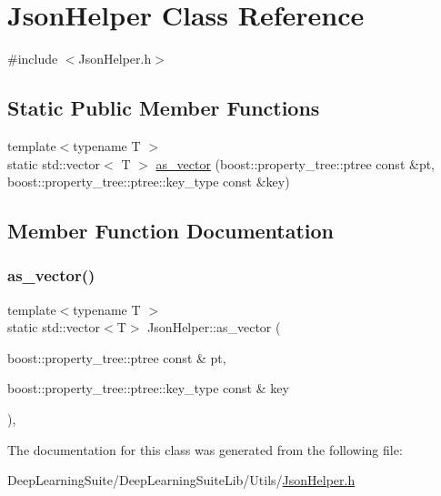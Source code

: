 \hypertarget{class_json_helper}{}\section{Json\+Helper Class Reference}
\label{class_json_helper}


{\ttfamily \#include $<$Json\+Helper.\+h$>$}

\subsection*{Static Public Member Functions}
\begin{DoxyCompactItemize}
\item 
{\footnotesize template$<$typename T $>$ }\\static std\+::vector$<$ T $>$ \hyperlink{class_json_helper_ab0c3df073a06036c7f5a0d4784470266}{as\+\_\+vector} (boost\+::property\+\_\+tree\+::ptree const \&pt, boost\+::property\+\_\+tree\+::ptree\+::key\+\_\+type const \&key)
\end{DoxyCompactItemize}


\subsection{Member Function Documentation}
\mbox{\label{class_json_helper_ab0c3df073a06036c7f5a0d4784470266}} 
\subsubsection{\texorpdfstring{as\+\_\+vector()}{as\_vector()}}
{\footnotesize\ttfamily template$<$typename T $>$ \\
static std\+::vector$<$T$>$ Json\+Helper\+::as\+\_\+vector (\begin{DoxyParamCaption}\item[{boost\+::property\+\_\+tree\+::ptree const \&}]{pt,  }\item[{boost\+::property\+\_\+tree\+::ptree\+::key\+\_\+type const \&}]{key }\end{DoxyParamCaption})\hspace{0.3cm}{\ttfamily [inline]}, {\ttfamily [static]}}



The documentation for this class was generated from the following file\+:\begin{DoxyCompactItemize}
\item 
Deep\+Learning\+Suite/\+Deep\+Learning\+Suite\+Lib/\+Utils/\hyperlink{_json_helper_8h}{Json\+Helper.\+h}\end{DoxyCompactItemize}
